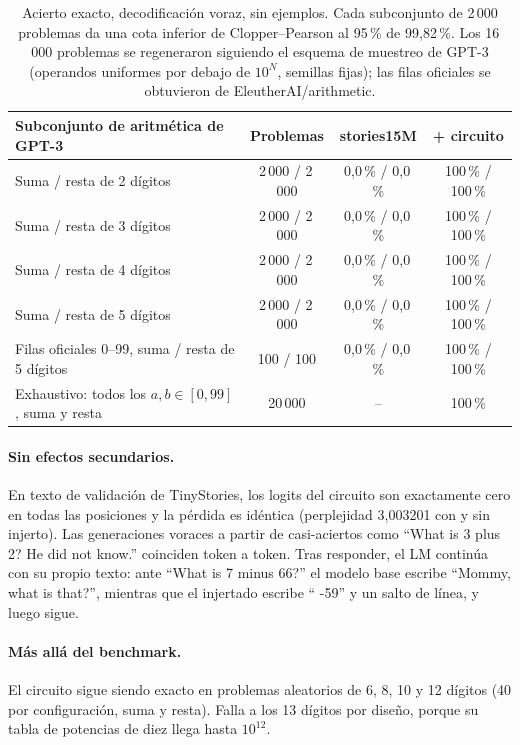 \documentclass[11pt]{article}
\begin{document}
\begin{table}[h]
\centering
\small
\begin{tabular}{lccc}
\toprule
Subconjunto de aritmética de GPT-3 & Problemas & stories15M & + circuito \\
\midrule
Suma / resta de 2 dígitos & 2\,000 / 2\,000 & 0,0\,\% / 0,0\,\% & 100\,\% / 100\,\% \\
Suma / resta de 3 dígitos & 2\,000 / 2\,000 & 0,0\,\% / 0,0\,\% & 100\,\% / 100\,\% \\
Suma / resta de 4 dígitos & 2\,000 / 2\,000 & 0,0\,\% / 0,0\,\% & 100\,\% / 100\,\% \\
Suma / resta de 5 dígitos & 2\,000 / 2\,000 & 0,0\,\% / 0,0\,\% & 100\,\% / 100\,\% \\
Filas oficiales 0--99, suma / resta de 5 dígitos & 100 / 100 & 0,0\,\% / 0,0\,\% & 100\,\% / 100\,\% \\
Exhaustivo: todos los $a,b\in[0,99]$, suma y resta & 20\,000 & -- & 100\,\% \\
\bottomrule
\end{tabular}
\caption{Acierto exacto, decodificación voraz, sin ejemplos. Cada subconjunto de 2\,000 problemas da una cota inferior de Clopper--Pearson al 95\,\% de 99,82\,\%. Los 16\,000 problemas se regeneraron siguiendo el esquema de muestreo de GPT-3 (operandos uniformes por debajo de $10^N$, semillas fijas); las filas oficiales se obtuvieron de EleutherAI/arithmetic.}
\end{table}

\paragraph{Sin efectos secundarios.} En texto de validación de TinyStories, los logits del circuito son exactamente cero en todas las posiciones y la pérdida es idéntica (perplejidad 3,003201 con y sin injerto). Las generaciones voraces a partir de casi-aciertos como ``What is 3 plus 2? He did not know.'' coinciden token a token. Tras responder, el LM continúa con su propio texto: ante ``What is 7 minus 66?'' el modelo base escribe ``Mommy, what is that?'', mientras que el injertado escribe `` -59'' y un salto de línea, y luego sigue.

\paragraph{Más allá del benchmark.} El circuito sigue siendo exacto en problemas aleatorios de 6, 8, 10 y 12 dígitos (40 por configuración, suma y resta). Falla a los 13 dígitos por diseño, porque su tabla de potencias de diez llega hasta $10^{12}$.
\end{document}
